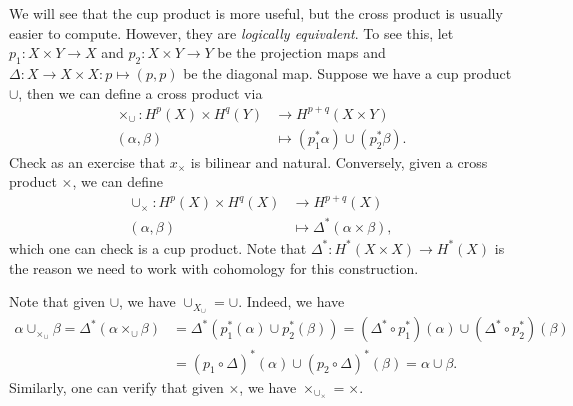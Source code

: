 \begin{remark}
  We will see that the cup product is more
  useful, but the cross product is usually easier
  to compute. However, they are \emph{logically equivalent}.
  To see this, let
  $p_1 : X \times Y \to X$ and $p_2 : X \times Y \to Y$
  be the projection maps and
  $\Delta : X \to X \times X : p \mapsto (p, p)$
  be the diagonal map. Suppose we have a
  cup product $\cup$, then we can define
  a cross product via
  \begin{align*}
    \times_{\cup} : H^p(X) \times H^q(Y)
    &\longrightarrow H^{p + q}(X \times Y) \\
    (\alpha, \beta)
    &\longmapsto (p_1^* \alpha) \cup (p_2^* \beta).
  \end{align*}
  Check as an exercise that
  $x_{\times}$ is bilinear and natural.
  Conversely, given a cross product $\times$,
  we can define
  \begin{align*}
    \cup_\times : H^p(X) \times H^q(X)
    &\longrightarrow H^{p + q}(X) \\
    (\alpha, \beta)
    &\longmapsto \Delta^*(\alpha \times \beta),
  \end{align*}
  which one can check is a cup product.
  Note that $\Delta^* : H^*(X \times X) \to H^*(X)$
  is the reason we need to work with
  cohomology for this construction.
\end{remark}

\begin{remark}
  Note that given $\cup$, we have
  $\cup_{X_{\cup}} = \cup$. Indeed, we have
  \begin{align*}
    \alpha \cup_{\times_{\cup}} \beta
    = \Delta^*(\alpha \times_{\cup} \beta)
    &= \Delta^*(p_1^*(\alpha) \cup p_2^*(\beta))
    = (\Delta^* \circ p_1^*)(\alpha) \cup (\Delta^* \circ p_2^*)(\beta) \\
    &= (p_1 \circ \Delta)^*(\alpha) \cup (p_2 \circ \Delta)^*(\beta)
    = \alpha \cup \beta.
  \end{align*}
  Similarly, one can verify that
  given $\times$, we have $\times_{\cup_{\times}} = \times$.
\end{remark}

